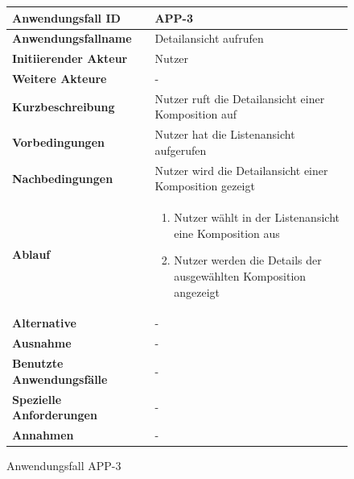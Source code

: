 \begin{figure}[h]
	\centering
	\begin{tabularx}{\textwidth}{ X | X }
		\textbf{Anwendungsfall ID} & APP-3 \\ \hline
		\textbf{Anwendungsfallname} & Detailansicht aufrufen \\ \hline
		\textbf{Initiierender Akteur} & Nutzer \\ \hline
		\textbf{Weitere Akteure} & -  \\ \hline
		\textbf{Kurzbeschreibung} & Nutzer ruft die Detailansicht einer Komposition auf  \\ \hline
		\textbf{Vorbedingungen} & Nutzer hat die Listenansicht aufgerufen  \\ \hline
		\textbf{Nachbedingungen} & Nutzer wird die Detailansicht einer Komposition gezeigt \\ \hline
		\textbf{Ablauf} &
		\begin{enumerate}
			\item Nutzer wählt in der Listenansicht eine Komposition aus
			\item Nutzer werden die Details der ausgewählten Komposition angezeigt
		\end{enumerate} \\ \hline
		\textbf{Alternative} &
		-  \\ \hline
		\textbf{Ausnahme} &
		- \\ \hline
		\textbf{Benutzte Anwendungsfälle} & - \\ \hline
		\textbf{Spezielle Anforderungen} & - \\ \hline
		\textbf{Annahmen} & -
	\end{tabularx}
	\caption{Anwendungsfall APP-3}
	\label{fig:anwendungsfall-app-tabelle-APP-3}
\end{figure}

\newpage

